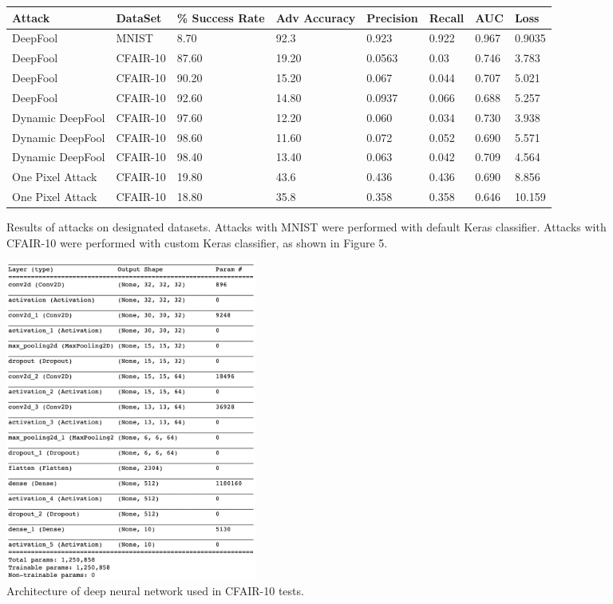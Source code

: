 \documentclass[../article.tex]{subfiles}
\begin{document}
\begin{figure}[H]
	\begin{tabular}{ |p{2cm}|p{2cm}||p{1.5cm}|p{1.5cm}|p{1.5cm}|p{1.5cm}|p{1.5cm}|p{1.5cm}|}
		\hline
		Attack & DataSet  & \% Success Rate & Adv Accuracy & Precision & Recall & AUC & Loss\\
		\hline
		\hline
		DeepFool & MNIST & 8.70 & 92.3 & 0.923 &0.922 & 0.967 & 0.9035 \\
		\hline
		DeepFool & CFAIR-10 & 87.60 & 19.20 & 0.0563 & 0.03 & 0.746 & 3.783  \\
		\hline
		DeepFool & CFAIR-10 & 90.20 & 15.20 & 0.067 & 0.044 & 0.707 & 5.021 \\
		\hline
		DeepFool & CFAIR-10 & 92.60 & 14.80 & 0.0937 & 0.066 & 0.688 & 5.257 \\
		\hline
		\hline
		Dynamic DeepFool & CFAIR-10 & 97.60 & 12.20 & 0.060 & 0.034 & 0.730 & 3.938 \\
		\hline
		Dynamic DeepFool & CFAIR-10 & 98.60 & 11.60 & 0.072 & 0.052 & 0.690 & 5.571 \\
		\hline
		Dynamic DeepFool & CFAIR-10 & 98.40 & 13.40 & 0.063 & 0.042 & 0.709 & 4.564 \\
		\hline
		One Pixel Attack & CFAIR-10 & 19.80 & 43.6 & 0.436 & 0.436 & 0.690 & 8.856\\
		\hline
		One Pixel Attack & CFAIR-10 & 18.80 & 35.8 & 0.358 & 0.358 & 0.646 & 10.159\\
		\hline
	\end{tabular}
	\caption{Results of attacks on designated datasets. Attacks with MNIST were performed with default Keras classifier. Attacks with CFAIR-10 were performed with custom Keras classifier, as shown in Figure 5.}
	\label{fig:ep0.4}
\end{figure}

\begin{figure} %
	\centering
	\includegraphics[width=0.4\textwidth]{cnn_arch.png}
	\caption{\label{fig:Figure 5} Architecture of deep neural network used in CFAIR-10 tests.}
\end{figure}
\end{document}
